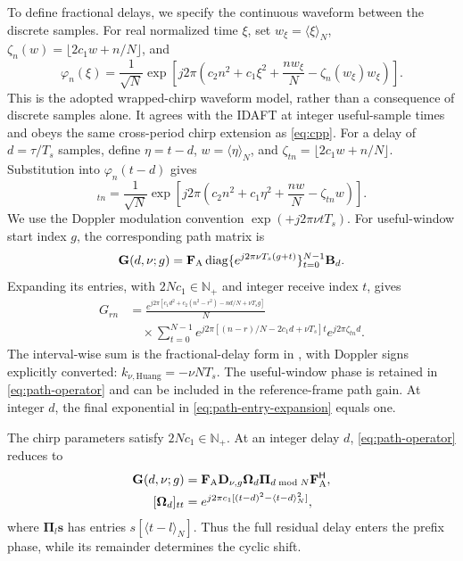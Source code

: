 \documentclass[10pt,a4paper]{article}
\newcommand{\diag}{\operatorname{diag}}
\begin{document}
To define fractional delays, we specify the continuous waveform between
the discrete samples. For real normalized time $\xi$, set
$w_\xi=\langle\xi\rangle_N$, $\zeta_n(w)=\lfloor2c_1w+n/N\rfloor$, and
\begin{equation*}
 \varphi_n(\xi)=\frac{1}{\sqrt N}
 \exp\!\left[j2\pi\left(c_2n^2+c_1\xi^2+\frac{nw_\xi}{N}
 -\zeta_n(w_\xi)w_\xi\right)\right].
 \tag{6a}\label{eq:continuous-waveform}
\end{equation*}
This is the adopted wrapped-chirp waveform model, rather than a
consequence of discrete samples alone. It agrees with the IDAFT at
integer useful-sample times and obeys the same cross-period chirp
extension as \eqref{eq:cpp}. For a delay of $d=\tau/T_s$ samples,
define $\eta=t-d$, $w=\langle\eta\rangle_N$, and
$\zeta_{tn}=\lfloor2c_1w+n/N\rfloor$. Substitution into
$\varphi_n(t-d)$ gives
\begin{equation}
 [\mathbf{B}_d]_{tn}=\frac{1}{\sqrt N}
 \exp\!\left[j2\pi\left(c_2n^2+c_1\eta^2
                  +\frac{nw}{N}-\zeta_{tn}w\right)\right].
 \label{eq:continuous-basis}
\end{equation}
We use the Doppler modulation convention $\exp(+j2\pi\nu tT_s)$.
For useful-window start index $g$, the corresponding path matrix is
\begin{equation}
 \mathbf{G}(d,\nu;g)=\mathbf{F}_{\rm A}
 \diag\{e^{j2\pi\nu T_s(g+t)}\}_{t=0}^{N-1}\mathbf{B}_d.
 \label{eq:path-operator}
\end{equation}
Expanding its entries, with $2Nc_1\in\mathbb N_+$ and integer receive
index $t$, gives
\begin{equation*}
 \begin{split}
 G_{rn}&=\frac{e^{j2\pi[c_1d^2+c_2(n^2-r^2)-nd/N+\nu T_sg]}}{N}\\
 &\quad\times\sum_{t=0}^{N-1}
 e^{j2\pi[(n-r)/N-2c_1d+\nu T_s]t}
 e^{j2\pi\zeta_{tn}d}.
 \end{split}
 \tag{8a}\label{eq:path-entry-expansion}
\end{equation*}
The interval-wise sum is the fractional-delay form in
\cite[Sec.~II, eq.~(5)]{huang2026}, with Doppler signs explicitly
converted: $k_{\nu,\mathrm{Huang}}=-\nu NT_s$. The useful-window phase
is retained in \eqref{eq:path-operator} and can be included in the
reference-frame path gain. At integer $d$, the final exponential in
\eqref{eq:path-entry-expansion} equals one.

The chirp parameters satisfy $2Nc_1\in\mathbb{N}_{+}$. At an integer
delay $d$, \eqref{eq:path-operator} reduces to
\begin{align}
 \mathbf{G}(d,\nu;g)&=\mathbf{F}_{\rm A}\mathbf{D}_{\nu,g}
             \bm\Omega_d\bm\Pi_{d\bmod N}\mathbf{F}_{\rm A}^{\mathsf H},
 \label{eq:integer-operator}\\
 [\bm\Omega_d]_{tt}&=
 e^{j2\pi c_1[(t-d)^2-\langle t-d\rangle_N^2]},
 \label{eq:integer-prefix-phase}
\end{align}
where $\bm\Pi_l\mathbf{s}$ has entries $s[\langle t-l\rangle_N]$.
Thus the full residual delay enters the prefix phase, while its remainder
determines the cyclic shift.
\end{document}
